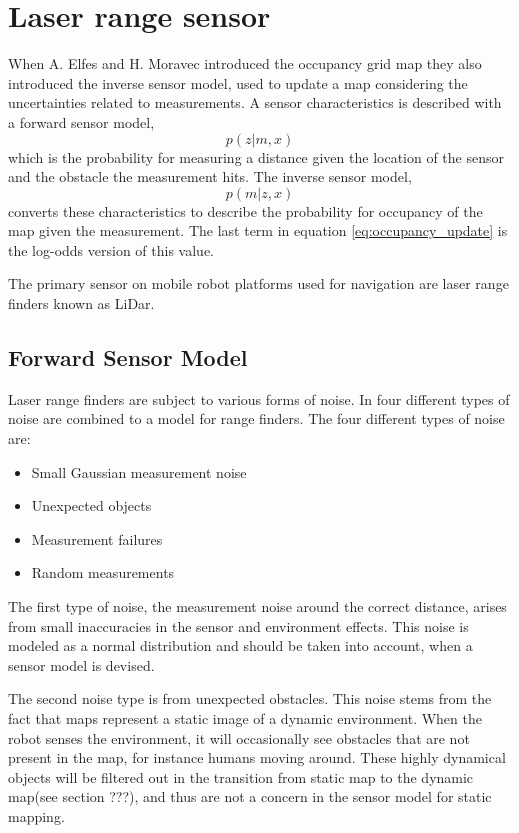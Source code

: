 \section{Laser range sensor}
\label{sec:laser_range_sensor}
When A. Elfes and H. Moravec introduced the occupancy grid map they also introduced the inverse sensor model, used to update a map considering the uncertainties related to measurements. 
A sensor characteristics is described with a forward sensor model, 
\begin{equation*}
	p(z|m,x)
\end{equation*}
which is the probability for measuring a distance given the location of the sensor and the obstacle the measurement hits. 
The inverse sensor model,
\begin{equation*}
	p(m|z,x)
\end{equation*}
converts these characteristics to describe the probability for occupancy of the map given the measurement. The last term in equation \ref{eq:occupancy_update} is the log-odds version of this value.

The primary sensor on mobile robot platforms used for navigation are laser range finders known as LiDar.

\subsection{Forward Sensor Model}
Laser range finders are subject to various forms of noise. In \cite{probRob} four different types of noise are combined to a model for range finders. 
The four different types of noise are:

\begin{itemize}
	\item Small Gaussian measurement noise
	\item Unexpected objects
	\item Measurement failures
	\item Random measurements
\end{itemize}

The first type of noise, the measurement noise around the correct distance, arises from small inaccuracies in the sensor and environment effects. This noise is modeled as a normal distribution and should be taken into account, when a sensor model is devised. 

The second noise type is from unexpected obstacles. This noise stems from the fact that maps represent a static image of a dynamic environment. When the robot senses the environment, it will occasionally see obstacles that are not present in the map, for instance humans moving around. These highly dynamical objects will be filtered out in the transition from static map to the dynamic map(see section ???), and thus are not a concern in the sensor model for static mapping.

